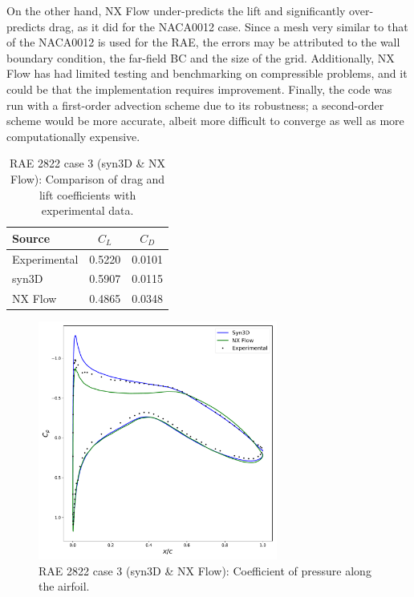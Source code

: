 On the other hand, NX Flow under-predicts the lift and significantly over-predicts drag, as it did for the NACA0012 case. Since a mesh very similar to that of the NACA0012 is used for the RAE, the errors may be attributed to the wall boundary condition, the far-field BC and the size of the grid. Additionally, NX Flow has had limited testing and benchmarking on compressible problems, and it could be that the implementation requires improvement. Finally, the code was run with a first-order advection scheme due to its robustness; a second-order scheme would be more accurate, albeit more difficult to converge as well as more computationally expensive.
\begin{table}
    \centering
    \caption{RAE 2822 case 3 (syn3D \& NX Flow): Comparison of drag and lift coefficients with experimental data.}
    \label{tab:raecase3}
    \begin{tabular}{@{}lcc@{}}
        \toprule
        Source & $C_L$ & $C_D$ \\
        \midrule
        Experimental & 0.5220 & 0.0101 \\
        syn3D & 0.5907 & 0.0115 \\
        NX Flow & 0.4865 & 0.0348 \\
         \bottomrule
    \end{tabular}
\end{table}
\begin{figure}
    \centering
    \includegraphics[width=0.7\textwidth]{figs/rae/cp_case3}
    \caption{RAE 2822 case 3 (syn3D \& NX Flow): Coefficient of pressure along the airfoil.}
    \label{fig:raecp3}
\end{figure}
